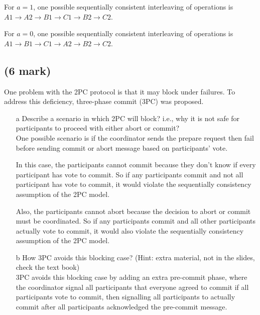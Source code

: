 \documentclass[11pt]{article}
\begin{document}
For $a = 1$, one possible sequentially consistent interleaving of operations is $A1 \to A2 \to B1 \to C1 \to B2 \to C2$.

For $a = 0$, one possible sequentially consistent interleaving of operations is $A1 \to B1 \to C1 \to A2 \to B2 \to C2$.


\newpage
\subsection{(6 mark)}
One problem with the 2PC protocol is that it may block under failures. To address this deficiency, three-phase commit (3PC) was proposed.

\begin{enumerate}
	\item[a] Describe a scenario in which 2PC will block? i.e., why it is not safe for participants to proceed with either abort or commit?\\
	
	One possible scenario is if the coordinator sends the prepare request then fail before sending commit or abort message based on participants' vote. 
	
	In this case, the participants cannot commit because they don't know if every participant has vote to commit. So if any participants commit and not all participant has vote to commit, it would violate the sequentially consistency assumption of the 2PC model.
	
	Also, the participants cannot abort because the decision to abort or commit must be coordinated. So if any participants commit and all other participants actually vote to commit, it would also violate the sequentially consistency assumption of the 2PC model.
	
	\item[b] How 3PC avoids this blocking case? (Hint: extra material, not in the slides, check the text book)\\
	
	3PC avoids this blocking case by adding an extra pre-commit phase, where the coordinator signal all participants that everyone agreed to commit if all participants vote to commit, then signalling all participants to actually commit after all participants acknowledged the pre-commit message.
	
	

\end{enumerate}
\end{document}
